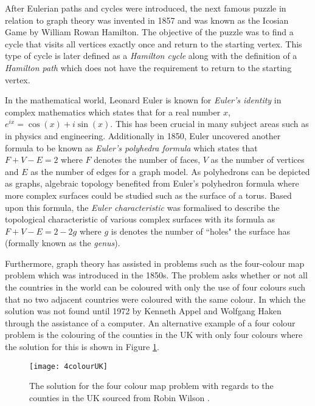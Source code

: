 After Eulerian paths and cycles were introduced, the next famous puzzle in relation to graph theory was invented in 1857 and was known as the Icosian Game \cite{carlson_2022} by William Rowan Hamilton. The objective of the puzzle was to find a cycle that visits all vertices exactly once and return to the starting vertex. This type of cycle is later defined as a \emph{Hamilton cycle} along with the definition of a \emph{Hamilton path} which does not have the requirement to return to the starting vertex.

In the mathematical world, Leonard Euler is known for \emph{Euler's identity} in complex mathematics which states that for a real number $x$, $e^{ix}=\cos(x)+i\sin(x)$. This has been crucial in many subject areas such as in physics and engineering. Additionally in 1850, Euler uncovered another formula to be known as \emph{Euler's polyhedra formula} which states that $F + V - E = 2$ where $F$ denotes the number of faces, $V$ as the number of vertices and $E$ as the number of edges for a graph model. As polyhedrons can be depicted as graphs, algebraic topology benefited from Euler's polyhedron formula where more complex surfaces could be studied such as the surface of a torus. Based upon this formula, the \emph{Euler characteristic} was formalised to describe the topological characteristic of various complex surfaces with its formula as $F + V - E = 2 - 2g$ where $g$ is denotes the number of ``holes" the surface has (formally known as the \emph{genus}). 

Furthermore, graph theory has assisted in problems such as the four-colour map problem which was introduced in the 1850s. The problem asks whether or not all the countries in the world can be coloured with only the use of four colours such that no two adjacent countries were coloured with the same colour. In which the solution was not found until 1972 by Kenneth Appel and Wolfgang Haken \cite{Ohnishi2009} through the assistance of a computer. An alternative example of a four colour problem is the colouring of the counties in the UK with only four colours where the solution for this is shown in Figure \ref{fig:UK 4 colour}.

\begin{figure}[H]
\centering
\texttt{[image: 4colourUK]}
\caption{The solution for the four colour map problem with regards to the counties in the UK sourced from Robin Wilson \cite{4ColourRobin}.}
\label{fig:UK 4 colour}
\end{figure}

